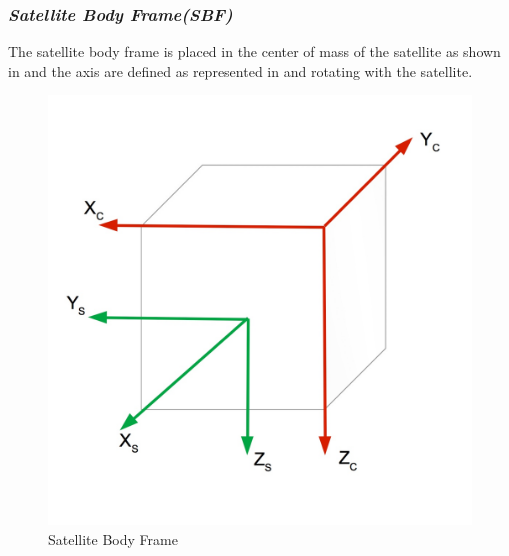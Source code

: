 \subsubsection{\textit{Satellite Body Frame(SBF)}}
The satellite body frame is placed in the center of mass of the satellite as shown in   and the axis are defined as represented in  and rotating with the satellite.
\begin{figure}[H]
\centering
\includegraphics[width=0.5\linewidth]{figures/frames}
\caption{Satellite Body Frame}
\label{fig:refframes}
\end{figure}

